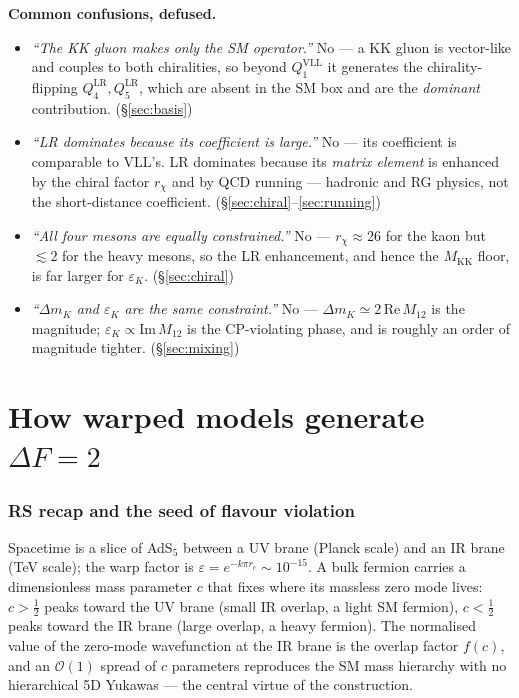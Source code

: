 \documentclass[11pt]{article}
\newenvironment{callout}[1]{%
  \par\medskip\begin{shaded}\noindent\textbf{#1}\par\smallskip}{\end{shaded}\medskip}
\newcommand{\MKK}{M_{\mathrm{KK}}}
\newcommand{\half}{\tfrac{1}{2}}
\newcommand{\eps}{\varepsilon}
\newcommand{\Mtwelve}{M_{12}}
\newcommand{\ImMtwelve}{\mathrm{Im}\,M_{12}}
\newcommand{\QVLL}{Q_1^{\mathrm{VLL}}}
\newcommand{\QLRfour}{Q_4^{\mathrm{LR}}}
\newcommand{\QLRfive}{Q_5^{\mathrm{LR}}}
\theoremstyle{definition}
\begin{document}
\begin{callout}{Common confusions, defused.}
\begin{itemize}[leftmargin=1.2em,nosep]
\item[\textbf{A.}] \emph{``The KK gluon makes only the SM operator.''} No --- a
KK gluon is vector-like and couples to both chiralities, so beyond $\QVLL$ it
generates the chirality-flipping $\QLRfour,\QLRfive$, which are absent in the SM
box and are the \emph{dominant} contribution. (\S\ref{sec:basis})
\item[\textbf{B.}] \emph{``LR dominates because its coefficient is large.''} No
--- its coefficient is comparable to VLL's. LR dominates because its \emph{matrix
element} is enhanced by the chiral factor $r_\chi$ and by QCD running ---
hadronic and RG physics, not the short-distance coefficient.
(\S\ref{sec:chiral}--\ref{sec:running})
\item[\textbf{C.}] \emph{``All four mesons are equally constrained.''} No ---
$r_\chi\approx26$ for the kaon but $\lesssim2$ for the heavy mesons, so the LR
enhancement, and hence the $\MKK$ floor, is far larger for $\eps_K$.
(\S\ref{sec:chiral})
\item[\textbf{D.}] \emph{``$\Delta m_K$ and $\eps_K$ are the same constraint.''}
No --- $\Delta m_K\simeq2\,\mathrm{Re}\,\Mtwelve$ is the magnitude;
$\eps_K\propto\ImMtwelve$ is the CP-violating phase, and is roughly an order of
magnitude tighter. (\S\ref{sec:mixing})
\end{itemize}
\end{callout}

\part{How warped models generate $\Delta F=2$}
\label{part:rs}

\section{RS recap and the seed of flavour violation}
\label{sec:rsrecap}

Spacetime is a slice of AdS$_5$ between a UV brane (Planck scale) and an IR brane
(TeV scale); the warp factor is $\eps = e^{-k\pi r_c}\sim10^{-15}$. A bulk fermion
carries a dimensionless mass parameter $c$ that fixes where its massless zero mode
lives: $c>\half$ peaks toward the UV brane (small IR overlap, a light SM fermion),
$c<\half$ peaks toward the IR brane (large overlap, a heavy fermion). The
normalised value of the zero-mode wavefunction at the IR brane is the overlap
factor $f(c)$, and an $\mathcal{O}(1)$ spread of $c$ parameters reproduces the SM
mass hierarchy with no hierarchical 5D Yukawas --- the central virtue of the
construction.
\end{document}
